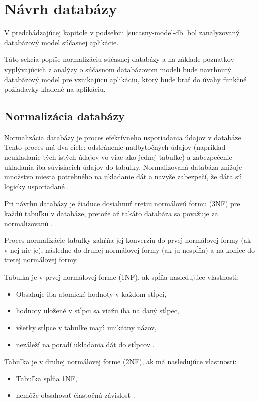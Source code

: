 \pagebreak

\section{Návrh databázy}
V predchádzajúcej kapitole v podsekcii \ref{sucasny-model-db} bol zanalyzovaný databázový model súčasnej aplikácie.

Táto sekcia popíše normalizáciu súčasnej databázy a na základe poznatkov vyplývajúcich z analýzy o súčasnom databázovom modeli bude navrhnutý databázový model pre vznikajúcu aplikáciu, ktorý bude brať do úvahy funkčné požiadavky kladené na aplikáciu.

\subsection{Normalizácia databázy}
Normalizácia databázy je proces efektívneho usporiadania údajov v databáze. Tento proces má dva ciele: odstránenie nadbytočných údajov (napríklad neukladanie tých istých údajov vo viac ako jednej tabuľke) a zabezpečenie ukladania iba  súvisiacich údajov do tabuľky. Normalizovaná databáza znižuje množstvo miesta potrebného na ukladanie dát a navyše zabezpečí, že dáta sú logicky usporiadané \cite{co-je-normalizacia}.

Pri návrhu databázy je žiaduce dosiahnuť tretiu normálovú formu (3NF) pre každú tabuľku v databáze, pretože až takáto databáza sa považuje za normalizovanú \cite{normalizovana-tabulka}.

Proces normalizácie tabuľky zahŕňa jej konverziu do prvej normálovej formy (ak v nej nie je), následne do druhej normálovej formy (ak ju nespĺňa) a na koniec do tretej normálovej formy.

Tabuľka je v prvej normálovej forme (1NF), ak spĺňa nasledujúce vlastnosti:
\begin{itemize}
	\item Obsahuje iba atomické hodnoty v každom stĺpci,
	\item hodnoty uložené v stĺpci sa viažu iba na daný stĺpec,
	\item všetky stĺpce v tabuľke majú unikátny názov,
	\item nezáleží na poradí ukladania dát do stĺpcov \cite{typy-normalizacie}. 
\end{itemize}

Tabuľka je v druhej normálovej forme (2NF), ak má nasledujúce vlastnosti:
\begin{itemize}
	\item Tabuľka spĺňa 1NF,
	\item nemôže obsahovať čiastočnú závislosť \cite{typy-normalizacie}.
\end{itemize}

